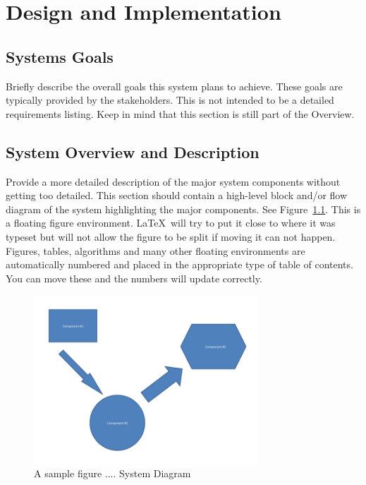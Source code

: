 

\chapter{Design  and Implementation}

\section{Systems Goals}
Briefly describe the overall goals this system plans to achieve.
These goals are typically provided by the stakeholders.  This is not
intended to be a detailed requirements listing.  Keep in mind that
this section is still part of the Overview.

\section{System Overview and Description}
Provide a more detailed description of the major system components
without getting too detailed.  This section should contain a
high-level block and/or flow diagram of the system highlighting the
major components.  See Figure~\ref{systemdiagram}.  This is a floating
figure environment.  \LaTeX\ will try to put it close to where it was
typeset but will not allow the figure to be split if moving it can not
happen.  Figures, tables, algorithms and many other floating
environments are automatically numbered and placed in the appropriate
type of table of contents.  You can move these and the numbers will
update correctly.

\begin{figure}[tbh]
\begin{center}
\includegraphics[width=0.75\textwidth]{./diagram}
\end{center}
\caption{A sample figure .... System Diagram \label{systemdiagram}}
\end{figure}

